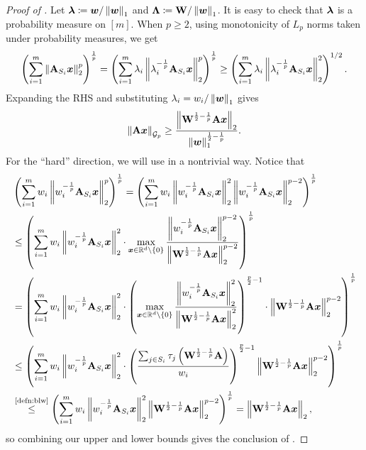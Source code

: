 \begin{proof}[Proof of ]
Let $\bm{\lambda} \coloneqq \bm{w}/\left\lVert \bm{w} \right\rVert_1$ and $\mathbf{\Lambda} \coloneqq \mathbf{W}/\left\lVert \bm{w} \right\rVert_1$. It is easy to check that $\bm{\lambda}$ is a probability measure on $[m]$. When $p \ge 2$, using monotonicity of $L_p$ norms taken under probability measures, we get
\begin{align*}
    \left(\sum_{i=1}^m \left\lVert \mathbf{A}_{S_i}\bm{x} \right\rVert_2^p\right)^{\frac{1}{p}} = \left(\sum_{i=1}^m \lambda_i\left\lVert \lambda_i^{-\frac{1}{p}}\mathbf{A}_{S_i}\bm{x} \right\rVert_2^p\right)^{\frac{1}{p}} \ge \left(\sum_{i=1}^m \lambda_i\left\lVert \lambda_i^{-\frac{1}{p}}\mathbf{A}_{S_i}\bm{x} \right\rVert_2^2\right)^{1/2}.
\end{align*}
Expanding the RHS and substituting $\lambda_i = w_i/\left\lVert \bm{w} \right\rVert_1$ gives
\begin{align*}
    \left\lVert \mathbf{A}\bm{x} \right\rVert_{\mathcal{G}_{p}} \ge \frac{\left\lVert \mathbf{W}^{\frac{1}{2}-\frac{1}{p}}\mathbf{A}\bm{x} \right\rVert_2}{\left\lVert \bm{w} \right\rVert_1^{\frac{1}{2}-\frac{1}{p}}}.
\end{align*}
For the ``hard'' direction, we will use  in a nontrivial way. Notice that
\begin{align*}
    &\inparen{\sum_{i=1}^m w_i\norm{w_i^{-\frac{1}{p}}\mA_{S_i}\vx}_2^p}^{\frac{1}{p}} = \inparen{\sum_{i=1}^m w_i\norm{w_i^{-\frac{1}{p}}\mA_{S_i}\vx}_2^2\norm{w_i^{-\frac{1}{p}}\mA_{S_i}\vx}_2^{p-2}}^{\frac{1}{p}} \\
    &\le \inparen{\sum_{i=1}^m w_i\norm{w_i^{-\frac{1}{p}}\mA_{S_i}\vx}_2^2 \cdot \max_{\vx\in\R^d\setminus\inbraces{0}}\frac{\norm{w_i^{-\frac{1}{p}}\mA_{S_i}\vx}_2^{p-2}}{\norm{\mW^{\frac{1}{2}-\frac{1}{p}}\mA\vx}_2^{p-2}}}^{\frac{1}{p}} \\
    &= \inparen{\sum_{i=1}^m w_i\norm{w_i^{-\frac{1}{p}}\mA_{S_i}\vx}_2^2 \cdot \inparen{\max_{\vx\in\R^d\setminus\inbraces{0}}\frac{\norm{w_i^{-\frac{1}{p}}\mA_{S_i}\vx}_2^{2}}{\norm{\mW^{\frac{1}{2}-\frac{1}{p}}\mA\vx}_2^{2}}}^{\frac{p}{2}-1}\cdot\norm{\mW^{\frac{1}{2}-\frac{1}{p}}\mA\vx}_{2}^{p-2}}^{\frac{1}{p}} \\
    &\le \inparen{\sum_{i=1}^m w_i\norm{w_i^{-\frac{1}{p}}\mA_{S_i}\vx}_2^2 \cdot \inparen{\frac{\sum_{j\in S_i}\tau_j\inparen{\mW^{\frac{1}{2}-\frac{1}{p}}\mA}}{w_i}}^{\frac{p}{2}-1}\norm{\mW^{\frac{1}{2}-\frac{1}{p}}\mA\vx}_{2}^{p-2}}^{\frac{1}{p}} \\
    &\overset{\text{\Cref{defn:blw}}}{\le} \inparen{\sum_{i=1}^m w_i\norm{w_i^{-\frac{1}{p}}\mA_{S_i}\vx}_2^2\norm{\mW^{\frac{1}{2}-\frac{1}{p}}\mA\vx}_{2}^{p-2}}^{\frac{1}{p}} = \norm{\mW^{\frac{1}{2}-\frac{1}{p}}\mA\vx}_2,
\end{align*}
so combining our upper and lower bounds gives the conclusion of .
\end{proof}